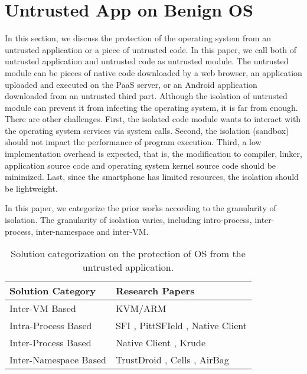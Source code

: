 \section{Untrusted App on Benign OS}
\label{sec:problem2}

In this section, we discuss the protection of the operating system from an
untrusted application or a piece of untrusted code. In this paper, we call both
of untrusted application and untrusted code as untrusted module. The untrusted
module can be pieces of native code downloaded by a web browser, an application
uploaded and executed on the PaaS server, or an Android application downloaded
from an untrusted third part. Although the isolation of untrusted module can
prevent it from infecting the operating system, it is far from enough. There are
other challenges. First, the isolated code module wants to interact with the
operating system services via system calls. Second, the isolation (sandbox)
should not impact the performance of program execution. Third, a low
implementation overhead is expected, that is, the modification to compiler,
linker, application source code and operating system kernel source code should
be minimized. Last, since the smartphone has limited resources, the isolation
should be lightweight. 

In this paper, we categorize the prior works according to the granularity of
isolation. The granularity of isolation varies, including intro-process,
inter-process, inter-namespace and inter-VM. 

\begin{table*}[ht]
	\centering
	\begin{tabular}{|l|l|}
		\hline
		\textbf{Solution Category}      & \textbf{Research Papers} \\ \hline
		Inter-VM Based         & KVM/ARM \cite{KVM/ARM} \\ \hline
		Intra-Process Based    & SFI \cite{SFI}, PittSFIeld \cite{PittSFIeld}, Native Client \cite{NaCl} \\ \hline
		Inter-Process Based    & Native Client \cite{NaCl}, Krude \etal \cite{Krude} \\ \hline
		Inter-Namespace Based  & TrustDroid \cite{TrustDroid}, Cells \cite{Cells}, AirBag \cite{AirBag} \\ \hline	
	\end{tabular}
	\caption{Solution categorization on the protection of OS from the untrusted
	application.}
	\label{my-label}
\end{table*}

